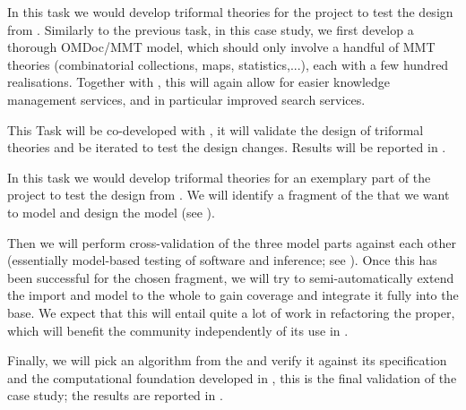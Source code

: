\begin{workpackage}[id=dksbases,%
  title=Data/Knowledge/Software-Bases,lead=JU,
  ZHRM=12,JURM=46,UWRM=25,SARM=10,LLRM=2,PSRM=4]
\begin{tasklist}

\begin{task}[title=FindStat Case Study (triformal theories),id=data-findstat,
  lead=JU,partners={ZH},PM=9,wphases=18-30!.5]
  In this task we would develop triformal theories for the \FindStat project to test the
  design from .  Similarly to the previous task, in this
  case study, we first develop a thorough OMDoc/MMT model, which should only involve a
  handful of MMT theories (combinatorial collections, maps, statistics,...), each with a
  few hundred realisations. Together with   , this will again allow for
  easier knowledge management services, and in particular improved search services.

  This Task will be co-developed with , it will validate
  the design of triformal theories and be iterated to test the design changes. Results
  will be reported in .
\end{task}

\begin{task}[title=\LMFDB Case study (triformal theories),id=data-LMFDB,
  lead=JU,partners={ZH,UW},PM=24,wphases={12-24!.25,24-48!.7}]
  In this task we would develop triformal theories for an exemplary part of the \LMFDB
  project to test the design from .  We will identify a
  fragment of the \LMFDB that we want to model and design the model (see
  ). 

  Then we will perform cross-validation of the three model parts against each other
  (essentially model-based testing of software and inference; see
  ). Once this has been successful for the chosen fragment, we
  will try to semi-automatically extend the import and model to the whole \LMFDB to gain
  coverage and integrate it fully into the \DKS base. We expect that this will entail
  quite a lot of work in refactoring the \LMFDB proper, which will benefit the \LMFDB
  community independently of its use in \TheProject.

  Finally, we will pick an algorithm from the \LMFDB and verify it against its
  specification and the computational foundation developed in
  , this is the final validation of the case study; the
  results are reported in .
  \end{task}


\end{tasklist}
\end{workpackage}
